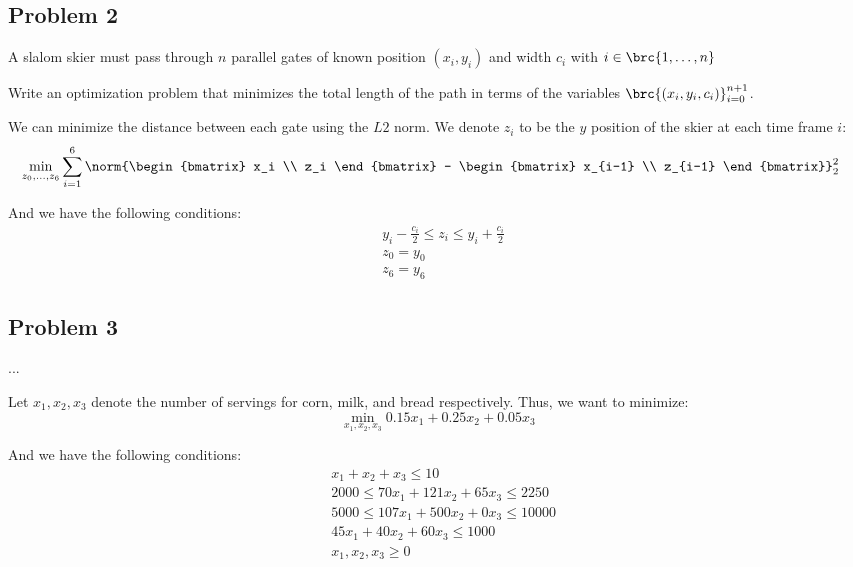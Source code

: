 \documentclass[openany]{book}
\begin{document}
\subsection{Problem 2}
A slalom skier must pass through $n$ parallel gates of known position $(x_i, y_i)$ and width $c_i$ with $i \in \brc{1, \ldots, n}$

\begin{hw}
	Write an optimization problem that minimizes the total length of the path in terms of the variables $\brc{(x_i, y_i, c_i)}_{i=0}^{n+1}$.
\end{hw}
\begin{solution}
	We can minimize the distance between each gate using the $L2$ norm. We denote $z_i$ to be the $y$ position of the skier at each time frame $i$:
	\begin{align*}
		\min_{z_0, \ldots, z_6} &\sum_{i=1}^{6} \norm{\begin{bmatrix}
				x_i \\ z_i
		\end{bmatrix} - \begin{bmatrix}
		x_{i-1} \\ z_{i-1}
	\end{bmatrix}}_2^{2}
	\end{align*}
	
	And we have the following conditions:
	\begin{align*}
		&y_i - \frac{c_i}{2} \leq z_i \leq y_i + \frac{c_i}{2} \\
		&z_0 = y_0 \\
		&z_6 = y_6
	\end{align*}
\end{solution}

\subsection{Problem 3}
\begin{hw}
	...
\end{hw}
\begin{solution}
	Let $x_1, x_2, x_3$ denote the number of servings for corn, milk, and bread respectively. Thus, we want to minimize:
	\begin{equation*}
		\min_{x_1, x_2, x_3} 0.15x_1 + 0.25x_2 + 0.05x_3
	\end{equation*}

	And we have the following conditions:
	\begin{align*}
		&x_1 + x_2 + x_3 \leq 10 \\
		&2000 \leq 70x_1 + 121x_2 + 65x_3 \leq 2250 \\
		&5000 \leq 107x_1 + 500x_2 + 0x_3 \leq 10000 \\
		&45x_1 + 40x_2 + 60x_3 \leq 1000 \\
		& x_1, x_2, x_3 \geq 0
	\end{align*}
\end{solution}
\end{document}
